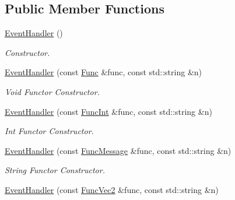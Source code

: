 \subsection*{Public Member Functions}
\begin{DoxyCompactItemize}
\item 
\hypertarget{class_event_handler_a8fe27b69582cce5c6a89a0b134bc8158}{\hyperlink{class_event_handler_a8fe27b69582cce5c6a89a0b134bc8158}{Event\+Handler} ()}\label{class_event_handler_a8fe27b69582cce5c6a89a0b134bc8158}

\begin{DoxyCompactList}\small\item\em Constructor. \end{DoxyCompactList}\item 
\hypertarget{class_event_handler_ac5aa9716cd85cf8d1a642b39da067c68}{\hyperlink{class_event_handler_ac5aa9716cd85cf8d1a642b39da067c68}{Event\+Handler} (const \hyperlink{class_event_handler_af1c003b45c76eb6eb0852801a997561b}{Func} \&func, const std\+::string \&n)}\label{class_event_handler_ac5aa9716cd85cf8d1a642b39da067c68}

\begin{DoxyCompactList}\small\item\em Void Functor Constructor. \end{DoxyCompactList}\item 
\hypertarget{class_event_handler_ab407fade3b0f1feb9e7db43007dcac0c}{\hyperlink{class_event_handler_ab407fade3b0f1feb9e7db43007dcac0c}{Event\+Handler} (const \hyperlink{class_event_handler_afc053859d1bdb89bd10f01ff22c99fed}{Func\+Int} \&func, const std\+::string \&n)}\label{class_event_handler_ab407fade3b0f1feb9e7db43007dcac0c}

\begin{DoxyCompactList}\small\item\em Int Functor Constructor. \end{DoxyCompactList}\item 
\hypertarget{class_event_handler_a636fa04a3de981fad47973d8a4a1f419}{\hyperlink{class_event_handler_a636fa04a3de981fad47973d8a4a1f419}{Event\+Handler} (const \hyperlink{class_event_handler_a21c76d0c722afe4925c87aa3544e2ce6}{Func\+Message} \&func, const std\+::string \&n)}\label{class_event_handler_a636fa04a3de981fad47973d8a4a1f419}

\begin{DoxyCompactList}\small\item\em String Functor Constructor. \end{DoxyCompactList}\item 
\hypertarget{class_event_handler_aeb54e46cc16b35a2f3ced7cdc31f3d55}{\hyperlink{class_event_handler_aeb54e46cc16b35a2f3ced7cdc31f3d55}{Event\+Handler} (const \hyperlink{class_event_handler_a814f37c7df5b2bf170d82904b3e525d6}{Func\+Vec2} \&func, const std\+::string \&n)}\label{class_event_handler_aeb54e46cc16b35a2f3ced7cdc31f3d55}


\end{DoxyCompactItemize}
